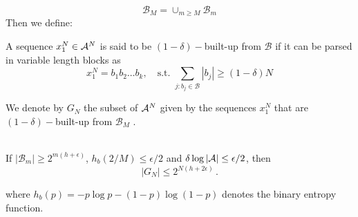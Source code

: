 \begin{equation*}
    \mathcal{B}_M = \cup_{m \geq M} \mathcal{B}_m
\end{equation*}
Then we define:
\begin{definition}
    A sequence $x_1^N \in \mathcal{A}^N$ is said to be $(1- \delta)-$built-up from $\mathcal{B}$ if it can be parsed in variable length blocks as 
    \begin{equation}
        x_1^N= b_1b_2\dots b_k, \quad \text{s.t.} \, \, \sum_{j: b_j \in \mathcal{B}} |b_j| \geq (1-\delta)N
    \end{equation}
\end{definition}
We denote by $G_N$ the subset of $\mathcal{A}^N$ given by the sequences $x_1^N$ that are $(1-\delta)-$built-up from $\mathcal{B}_M$ .
\begin{lemma}
\hfill \\
    If $|\mathcal{B}_m| \geq 2^{m (h+\epsilon)}$, $h_b(2/M) \leq \epsilon/2$ and $\delta \log |\mathcal{A}| \leq \epsilon/2$, then 
    \begin{equation*}
        |G_N| \leq 2^{N(h + 2\epsilon)}\, .
    \end{equation*}
\end{lemma}
where $h_b(p) = -p \log p - (1-p) \log(1-p)$ denotes the binary entropy function.
